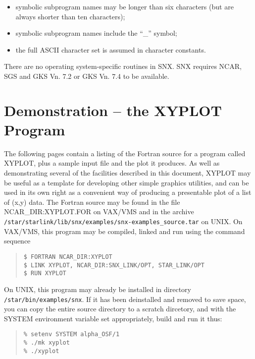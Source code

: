 \begin {itemize}
\item symbolic subprogram names may be longer than six characters (but are 
always shorter than ten characters);
\item symbolic subprogram names include the ``\_'' symbol;
\item the full ASCII character set is assumed in character constants.
\end {itemize}

There are no operating system-specific routines in SNX.
SNX requires NCAR, SGS and GKS Vn. 7.2 or GKS Vn. 7.4 to be available.


\section {Demonstration -- the XYPLOT Program} \label{demo1_sect}
 
The following pages contain a listing of the Fortran source for a
program called XYPLOT, plus a sample input file and the plot it
produces.  As well as demonstrating several of the facilities described
in this document, XYPLOT may be useful as a template for developing
other simple graphics utilities, and can be used in its own right as a
convenient way of producing a presentable plot of a list of (x,y)
data.  The Fortran source may be found in the file NCAR\_DIR:XYPLOT.FOR
on VAX/VMS and in the archive {\tt
/star/\-starlink/\-lib/\-snx/\-examples/\-snx-examples\_source.tar} on
UNIX.  On VAX/VMS, this program may be compiled, linked and run using
the command sequence

\begin {quote}
\begin{verbatim}
$ FORTRAN NCAR_DIR:XYPLOT
$ LINK XYPLOT, NCAR_DIR:SNX_LINK/OPT, STAR_LINK/OPT
$ RUN XYPLOT
\end{verbatim}
\end {quote}

On UNIX, this program may already be installed in directory 
{\tt /star/bin/examples/snx}.  If it has been deinstalled and removed to save
space, you can copy the entire source directory to a scratch dircetory, and
with the SYSTEM environment variable set appropriately, build and run it thus:

\begin {quote}
\begin{verbatim}
% setenv SYSTEM alpha_OSF/1
% ./mk xyplot
% ./xyplot
\end{verbatim}
\end {quote}

